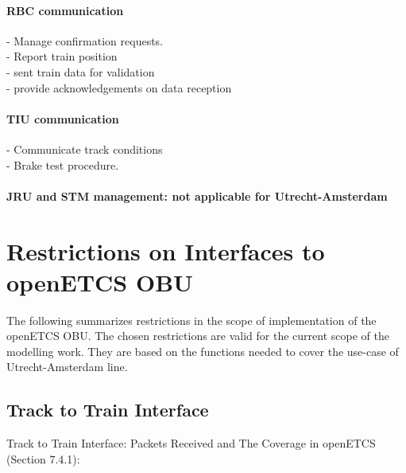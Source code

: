 \documentclass{template/openetcs_report}
\begin{document}
\subsubsection{RBC communication}
- Manage confirmation requests.\\
- Report train position\\
- sent train data for validation\\
- provide acknowledgements on data reception\\

\subsubsection{TIU communication}
- Communicate track conditions\\
- Brake test procedure.\\

\subsubsection{JRU and \gls{STM} management: not applicable for Utrecht-Amsterdam}

\newpage

 
\appendix{}

\chapter{Restrictions on Interfaces to openETCS OBU}
The following summarizes restrictions in the scope of implementation of the openETCS OBU. The chosen restrictions are valid for the current scope of the modelling work. They are based on the functions needed to cover the use-case of Utrecht-Amsterdam line.

\section{Track to Train Interface}

Track to Train Interface: Packets Received and The Coverage in openETCS (Section 7.4.1):
\end{document}

